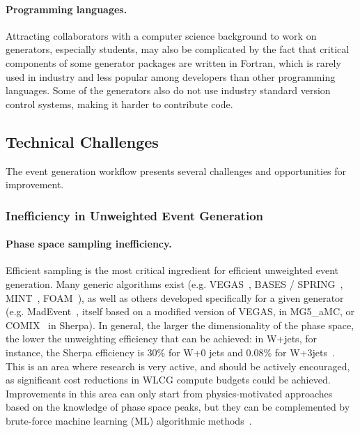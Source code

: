 \documentclass[11pt,a4paper]{article}
\begin{document}
\paragraph{Programming languages.} Attracting collaborators with a computer
science background to work on generators, especially students, may also
be complicated by the fact that critical components of some generator
packages are written in Fortran, which is rarely used in industry and
less popular among developers than other programming languages. Some of
the generators also do not use industry standard version control
systems, making it harder to contribute code.

\hypertarget{technical-challenges-software-and-computing}{%
\subsection{Technical Challenges}\label{technical-challenges-software-and-computing}}

The event generation workflow presents several challenges and
opportunities for improvement.

\subsubsection{Inefficiency in Unweighted Event Generation}

\paragraph{Phase space sampling inefficiency.} Efficient sampling is the most
critical ingredient for efficient unweighted event generation. Many
generic algorithms exist (e.g. VEGAS~\cite{Lep80}, BASES / SPRING~\cite{Kaw86}, 
MINT~\cite{Nas07}, FOAM~\cite{Jad03}), as well as others
developed specifically for a given generator (e.g. MadEvent~\cite{Mal03},
itself based on a modified version of VEGAS, in MG5\_aMC, or COMIX~\cite{Gle08} 
in Sherpa). In general, the larger the dimensionality of the
phase space, the lower the unweighting efficiency that can be achieved:
in W+jets, for instance, the Sherpa efficiency is 30\% for W+0 jets and
0.08\% for W+3jets~\cite{Gao20}. This is an area where research is very
active, and should be actively encouraged, as significant cost
reductions in WLCG compute budgets could be achieved. Improvements in
this area can only start from physics-motivated approaches based on the
knowledge of phase space peaks, but they can be complemented by
brute-force machine learning (ML) algorithmic methods~\cite{Ben17,Bot20,Gao20,Kli18}.
\end{document}
